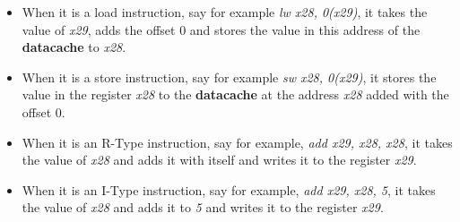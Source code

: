 \begin{itemize}
  \item When it is a load instruction, say for example \textit{lw x28, 0(x29)}, it takes the value of \textit{x29}, adds the offset 0 and stores the value in this address of the \textbf{data\textunderscore cache} to \textit{x28}.
  \item When it is a store instruction, say for example \textit{sw x28, 0(x29)}, it stores the value in the register \textit{x28} to the \textbf{data\textunderscore cache} at the address \textit{x28} added with the offset 0.
  \item When it is an R-Type instruction, say for example, \textit{add x29, x28, x28}, it takes the value of \textit{x28} and adds it with itself and writes it to the register \textit{x29}.
  \item When it is an I-Type instruction, say for example, \textit{add x29, x28, 5}, it takes the value of \textit{x28} and adds it to \textit{5} and writes it to the register \textit{x29}.

\end{itemize}

% 

